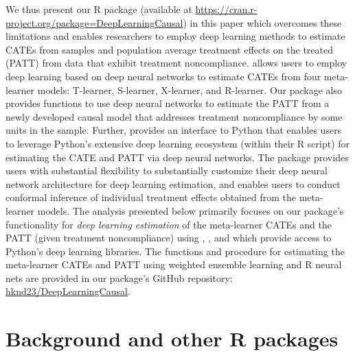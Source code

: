 We thus present our R package  (available at
\url{https://cran.r-project.org/package=DeepLearningCausal}) in this paper
which overcomes these limitations and enables researchers to employ deep
learning methods to estimate CATEs from samples and population average
treatment effects on the treated (PATT) from data that exhibit treatment
noncompliance.  allows users to employ deep
learning based on deep neural networks to estimate CATEs from four
meta-learner models: T-learner, S-learner, X-learner, and R-learner. Our
package also provides functions to use deep neural networks to estimate
the PATT from a newly developed causal model that addresses treatment
noncompliance by some units in the sample. Further,
 provides an interface to Python that enables
users to leverage Python's extensive deep learning ecosystem (within
their R script) for estimating the CATE and PATT via deep neural
networks. The package provides users with substantial flexibility to
substantially customize their deep neural network architecture for deep
learning estimation, and enables users to conduct conformal inference of
individual treatment effects obtained from the meta-learner models. The
analysis presented below primarily focuses on our package's
functionality for \emph{deep learning estimation} of the meta-learner CATEs
and the PATT (given treatment noncompliance) using
\citep{reticulate},  \citep{tensorflow, tensorflow2015-whitepaper}, and  \citep{keras3, chollet2015keras} which provide access to Python's deep learning
libraries. The functions and procedure for estimating the meta-learner
CATEs and PATT using weighted ensemble learning and R neural nets are
provided in our package's GitHub repository:
\href{https://github.com/hknd23/DeepLearningCausal}{hknd23/DeepLearningCausal}.

\section{Background and other R packages}\label{background-and-other-r-packages}

